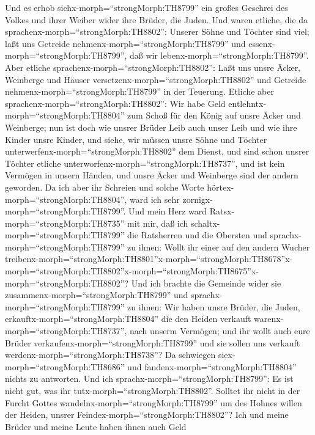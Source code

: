  Und es erhob sichx-morph=``strongMorph:TH8799'' ein großes
Geschrei des Volkes und ihrer Weiber wider ihre Brüder, die Juden.
 Und waren etliche, die da
sprachenx-morph=``strongMorph:TH8802'': Unserer Söhne und Töchter sind
viel; laßt uns Getreide nehmenx-morph=``strongMorph:TH8799'' und
essenx-morph=``strongMorph:TH8799'', daß wir
lebenx-morph=``strongMorph:TH8799''.  Aber etliche
sprachenx-morph=``strongMorph:TH8802'': Laßt uns unsre Äcker, Weinberge
und Häuser versetzenx-morph=``strongMorph:TH8802'' und Getreide
nehmenx-morph=``strongMorph:TH8799'' in der Teuerung. 
Etliche aber sprachenx-morph=``strongMorph:TH8802'': Wir habe Geld
entlehntx-morph=``strongMorph:TH8804'' zum Schoß für den König auf unsre
Äcker und Weinberge;  nun ist doch wie unsrer Brüder Leib
auch unser Leib und wie ihre Kinder unsre Kinder, und siehe, wir müssen
unsre Söhne und Töchter unterwerfenx-morph=``strongMorph:TH8802'' dem
Dienst, und sind schon unsrer Töchter etliche
unterworfenx-morph=``strongMorph:TH8737'', und ist kein Vermögen in
unsern Händen, und unsre Äcker und Weinberge sind der andern geworden.
 Da ich aber ihr Schreien und solche Worte
hörtex-morph=``strongMorph:TH8804'', ward ich sehr
zornigx-morph=``strongMorph:TH8799''.  Und mein Herz ward
Ratsx-morph=``strongMorph:TH8735'' mit mir, daß ich
schaltx-morph=``strongMorph:TH8799'' die Ratsherren und die Obersten und
sprachx-morph=``strongMorph:TH8799'' zu ihnen: Wollt ihr einer auf den
andern Wucher
treibenx-morph=``strongMorph:TH8801''\textbar x-morph=``strongMorph:TH8678''x-morph=``strongMorph:TH8802''\textbar x-morph=``strongMorph:TH8675''x-morph=``strongMorph:TH8802''?
Und ich brachte die Gemeinde wider sie
zusammenx-morph=``strongMorph:TH8799''  und
sprachx-morph=``strongMorph:TH8799'' zu ihnen: Wir haben unsre Brüder,
die Juden, erkauftx-morph=``strongMorph:TH8804'' die den Heiden verkauft
warenx-morph=``strongMorph:TH8737'', nach unserm Vermögen; und ihr wollt
auch eure Brüder verkaufenx-morph=``strongMorph:TH8799'' und sie sollen
uns verkauft werdenx-morph=``strongMorph:TH8738''? Da schwiegen
siex-morph=``strongMorph:TH8686'' und
fandenx-morph=``strongMorph:TH8804'' nichts zu antworten. 
Und ich sprachx-morph=``strongMorph:TH8799'': Es ist nicht gut, was ihr
tutx-morph=``strongMorph:TH8802''. Solltet ihr nicht in der Furcht
Gottes wandelnx-morph=``strongMorph:TH8799'' um des Hohnes willen der
Heiden, unsrer Feindex-morph=``strongMorph:TH8802''?  Ich
und meine Brüder und meine Leute haben ihnen auch Geld
